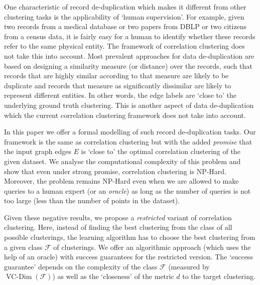 \documentclass[12pt]{article}
\newcommand{\mc}{\mathcal}
\DeclareMathOperator*{\vcdim}{VC-Dim}
\begin{document}
One characteristic of record de-duplication which makes it different from other clustering tasks is the applicability of `human supervision'. For example, given two records from a medical database or two papers from DBLP or two citizens from a census data, it is fairly easy for a human to identify whether these records refer to the same physical entity. The framework of correlation clustering does not take this into account. Most prevalent approaches for data de-duplication are based on designing a similarity measure (or distance) over the records, such that records that are highly similar according to that measure are likely to be duplicate and records that measure as significantly dissimilar are likely to represent different entities. In other words, the edge labels are `close to' the underlying ground truth clustering. This is another aspect of data de-duplication which the current correlation clustering framework does not take into account. 
  
In this paper we offer a formal modelling of such record de-duplication tasks. Our framework is the same as correlation clustering but with the added \textit{promise} that the input graph edges $E$ is `close to' the optimal correlation clustering of the given dataset. We analyse the computational complexity of this problem and show that even under strong promise, correlation clustering is NP-Hard. Moreover, the problem remains NP-Hard even when we are allowed to make queries to a human expert (or an \textit{oracle}) as long as the number of queries is not too large (less than the number of points in the dataset). 

Given these negative results, we propose a \textit{restricted} variant of correlation clustering. Here, instead of finding the best clustering from the class of all possible clusterings, the learning algorithm has to choose the best clustering from a given class $\mc F$ of clusterings. We offer an algorithmic approach (which uses the help of an oracle) with success guarantees for the restricted version. The `success guarantee' depends on the complexity of the class $\mc F$ (measured by $\vcdim(\mc F)$) as well as the `closeness' of the metric $d$ to the target clustering.  
\end{document}
